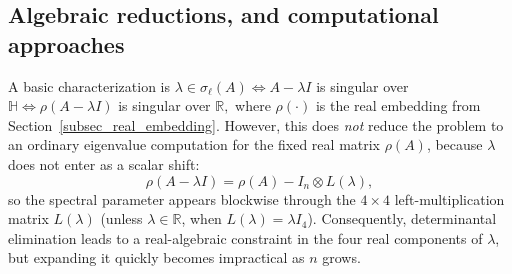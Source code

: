 \documentclass[preprint,12pt]{elsarticle}  %
\theoremstyle{definition}
\theoremstyle{definition}
\theoremstyle{definition}
\theoremstyle{definition}
\theoremstyle{definition}
\theoremstyle{remark}
\theoremstyle{remark}
\theoremstyle{remark}
\newcommand{\RR}{\mathbb{R}}
\newcommand{\HH}{\mathbb{H}}
\begin{document}
\subsection{Algebraic reductions, and computational approaches}
\label{subsec_left_spectrum_computation}
A basic characterization is $\lambda\in\sigma_\ell(A)\Longleftrightarrow
A-\lambda I$  is singular over $\HH\Longleftrightarrow\rho(A-\lambda I)$ is singular over $\RR,$ where $\rho(\cdot)$ is the real embedding from Section~\ref{subsec_real_embedding}.
However, this does \emph{not} reduce the problem to an ordinary eigenvalue computation for the fixed real matrix $\rho(A)$,
because $\lambda$ does not enter as a scalar shift:
\[
\rho(A-\lambda I)=\rho(A)-I_n\otimes L(\lambda),
\]
so the spectral parameter appears blockwise through the $4\times4$ left-multipli\-cation matrix $L(\lambda)$ (unless $\lambda\in\RR$, when $L(\lambda)=\lambda I_4$). Consequently, determinantal elimination leads to a real-algebraic constraint in the four real components of $\lambda$, but expanding it quickly becomes impractical as $n$ grows.
%
\end{document}
